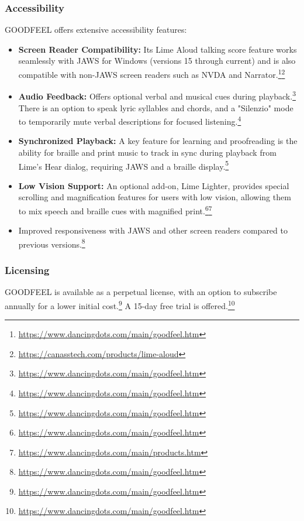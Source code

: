 \subsubsection{Accessibility}
GOODFEEL offers extensive accessibility features:
\begin{itemize}[noitemsep,topsep=0pt]
    \item \textbf{Screen Reader Compatibility:} Its Lime Aloud talking score feature works seamlessly with JAWS for Windows (versions 15 through current) and is also compatible with non-JAWS screen readers such as NVDA and Narrator.\footnote{\url{https://www.dancingdots.com/main/goodfeel.htm}}\footnote{\url{https://canasstech.com/products/lime-aloud}}
    \item \textbf{Audio Feedback:} Offers optional verbal and musical cues during playback.\footnote{\url{https://www.dancingdots.com/main/goodfeel.htm}} There is an option to speak lyric syllables and chords, and a "Silenzio" mode to temporarily mute verbal descriptions for focused listening.\footnote{\url{https://www.dancingdots.com/main/goodfeel.htm}}
    \item \textbf{Synchronized Playback:} A key feature for learning and proofreading is the ability for braille and print music to track in sync during playback from Lime's Hear dialog, requiring JAWS and a braille display.\footnote{\url{https://www.dancingdots.com/main/goodfeel.htm}}
    \item \textbf{Low Vision Support:} An optional add-on, Lime Lighter, provides special scrolling and magnification features for users with low vision, allowing them to mix speech and braille cues with magnified print.\footnote{\url{https://www.dancingdots.com/main/goodfeel.htm}}\footnote{\url{https://www.dancingdots.com/main/products.htm}}
    \item Improved responsiveness with JAWS and other screen readers compared to previous versions.\footnote{\url{https://www.dancingdots.com/main/goodfeel.htm}}
\end{itemize}

\subsubsection{Licensing}
GOODFEEL is available as a perpetual license, with an option to subscribe annually for a lower initial cost.\footnote{\url{https://www.dancingdots.com/main/goodfeel.htm}} A 15-day free trial is offered.\footnote{\url{https://www.dancingdots.com/main/goodfeel.htm}}

